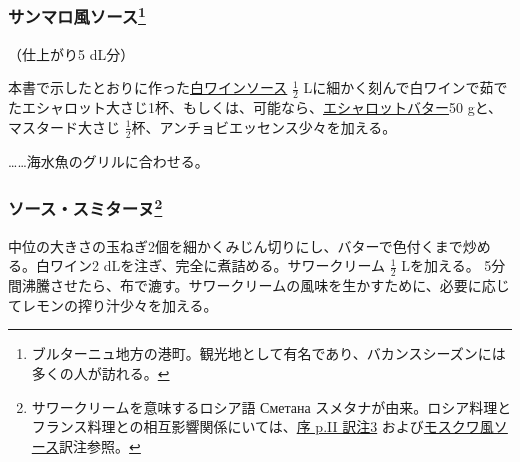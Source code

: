 \begin{recette}
{\subsubsection[サンマロ風ソース]{\texorpdfstring{サンマロ風ソース\footnote{ブルターニュ地方の港町。観光地として有名であり、バカンスシーズンには多くの人が訪れる。}}{サンマロ風ソース}}\label{sauce-saint-malo}}


 

（仕上がり5 dL分）

本書で示したとおりに作った\protect\hyperlink{sauce-vin-blanc}{白ワインソース}
\(\frac{1}{2}\)
Lに細かく刻んで白ワインで茹でたエシャロット大さじ1杯、もしくは、可能なら、\protect\hyperlink{beurre-d-echalote}{エシャロットバター}50
gと、マスタード大さじ
\(\frac{1}{2}\)杯、アンチョビエッセンス少々を加える。

\ldots{}\ldots{}海水魚のグリルに合わせる。

\atoaki{}

\hypertarget{sauce-smitane}{%
\subsubsection[ソース・スミターヌ]{\texorpdfstring{ソース・スミターヌ\footnote{サワークリームを意味するロシア語
   Сметана
  スメタナが由来。ロシア料理とフランス料理との相互影響関係にいては、\protect\hyperlink{service-russe}{序
  p.II 訳注3}
  および\protect\hyperlink{sauce-moscovite}{モスクワ風ソース}訳注参照。}}{ソース・スミターヌ}}\label{sauce-smitane}}


 

中位の大きさの玉ねぎ2個を細かくみじん切りにし、バターで色付くまで炒める。白ワイン2
dLを注ぎ、完全に煮詰める。サワークリーム \(\frac{1}{2}\) Lを加える。
5分間沸騰させたら、布で漉す。サワークリームの風味を生かすために、必要に応じてレモンの搾り汁少々を加える。


\end{recette}
